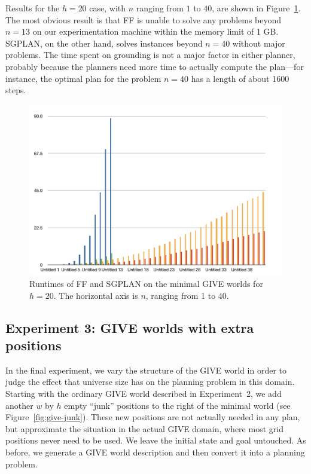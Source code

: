 Results for the $h=20$ case, with $n$ ranging from $1$ to $40$, are shown
in Figure~\ref{fig:give-runtime-minimal}.  The most obvious result is that
FF is unable to solve any problems beyond $n=13$ on our experimentation
machine within the memory limit of 1 GB.  SGPLAN, on the other hand, solves
instances beyond $n=40$ without major problems.  The time spent on
grounding is not a major factor in either planner, probably because the
planners need more time to actually compute the plan---for instance, the
optimal plan for the problem $n=40$ has a length of about 1600 steps.

\begin{figure}
  \centering
  \includegraphics[width=1\columnwidth]{pic-runtime-buttons}
  \caption{Runtimes of FF and SGPLAN on the minimal GIVE worlds for $h=20$. The horizontal axis is $n$, ranging from 1 to 40.}
  \label{fig:give-runtime-minimal}
\end{figure}


\subsection{Experiment 3: GIVE worlds with extra positions}
\label{sec:experiment-3:-give}

In the final experiment, we vary the structure of the GIVE world in order
to judge the effect that universe size has on the planning problem in this
domain.  Starting with the ordinary GIVE world described in Experiment~2,
we add another $w$ by $h$ empty ``junk'' positions to the right of the
minimal world (see Figure~\ref{fig:give-junk}). These new positions are not
actually needed in any plan, but approximate the situation in the actual
GIVE domain, where most grid positions never need to be used. We leave the
initial state and goal untouched. As before, we generate a GIVE world
description and then convert it into a planning problem.

